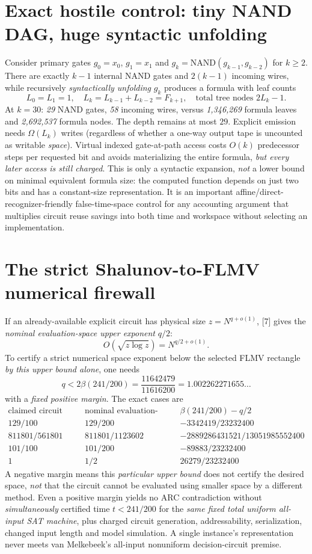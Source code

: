 \documentclass[11pt]{article}
\begin{document}
\section{Exact hostile control: tiny NAND DAG, huge syntactic unfolding}
Consider primary gates $g_0=x_0$, $g_1=x_1$ and $g_k=\mathrm{NAND}(g_{k-1},g_{k-2})$ for $k\ge2$. There are exactly $k-1$ internal NAND gates and $2(k-1)$ incoming wires, while recursively \emph{syntactically unfolding} $g_k$ produces a formula with leaf counts
\[
L_0=L_1=1,\quad L_k=L_{k-1}+L_{k-2}=F_{k+1},
\quad\text{total tree nodes }2L_k-1.
\]
At $k=30$: \emph{29} NAND gates, \emph{58} incoming wires, versus \emph{1,346,269} formula leaves and \emph{2,692,537} formula nodes. The depth remains at most $29$. Explicit emission needs $\Omega(L_k)$ writes (regardless of whether a one-way output tape is uncounted as writable \emph{space}). Virtual indexed gate-at-path access costs $O(k)$ predecessor steps per requested bit and avoids materializing the entire formula, \emph{but every later access is still charged}.
This is only a syntactic expansion, \emph{not} a lower bound on minimal equivalent formula size: the computed function depends on just two bits and has a constant-size representation. It is an important affine/direct-recognizer-friendly false-time-space control for any accounting argument that multiplies circuit reuse savings into both time and workspace without selecting an implementation.

\section{The strict Shalunov-to-FLMV numerical firewall}
If an already-available explicit circuit has physical size $z=N^{q+o(1)}$, [7] gives the \emph{nominal evaluation-space upper exponent} $q/2$:
\[
O(\sqrt{z\log z})=N^{q/2+o(1)}.
\]
To certify a strict numerical space exponent below the selected FLMV rectangle \emph{by this upper bound alone}, one needs
\[
\boxed{\quad q<2\beta(241/200)
=\frac{11642479}{11616200}=1.002262271655\ldots\quad}
\]
with a \emph{fixed positive margin}. The exact cases are
\[
\begin{array}{c|c|c}
\text{claimed circuit exponent}&\text{nominal evaluation-space exponent}&
\beta(241/200)-q/2\\\hline
129/100 &129/200&-3342419/23232400\\
811801/561801 &811801/1123602&-2889286431521/13051985552400\\
101/100&101/200&-89883/23232400\\
1&1/2&26279/23232400
\end{array}
\]
A negative margin means this \emph{particular upper bound} does not certify the desired space, \emph{not} that the circuit cannot be evaluated using smaller space by a different method. Even a positive margin yields no ARC contradiction without \emph{simultaneously} certified time $t<241/200$ for the \emph{same fixed total uniform all-input SAT machine}, plus charged circuit generation, addressability, serialization, changed input length and model simulation. A single instance's representation never meets van Melkebeek's all-input nonuniform decision-circuit premise.
\end{document}
